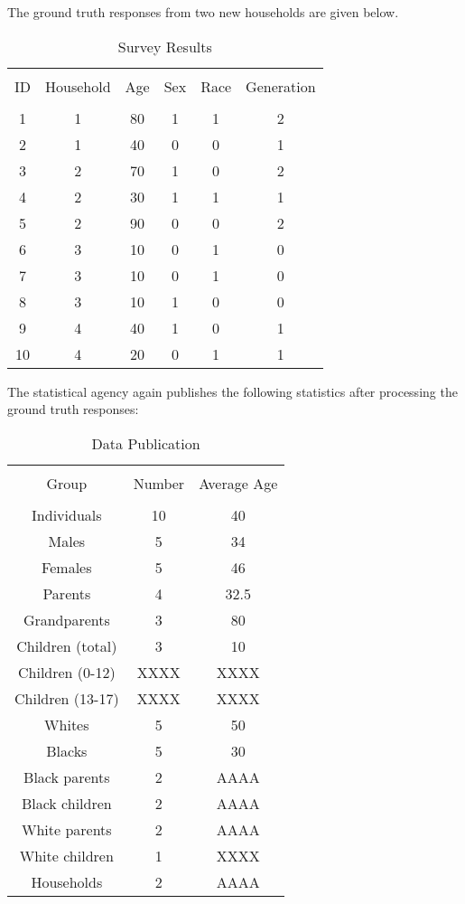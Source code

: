 \documentclass[jou,apacite]{apa6}
\begin{document}
The ground truth responses from two new households are given below.
\begin{table}[!htb]
\caption{Survey Results}\label{tab7}
\begin{tabular}{c|c|c|c|c|c}
\hline\\[-1.5ex]
ID & Household & Age & Sex & Race & Generation \\[0.5ex]
\hline\\[-1.5ex]
1 & 1 & 80 & 1 & 1 & 2  \\[0.5ex]
2 & 1 & 40 & 0 & 0 & 1  \\[0.5ex]
3 & 2 & 70 & 1 & 0 & 2  \\[0.5ex]
4 & 2 & 30 & 1 & 1 & 1  \\[0.5ex]
5 & 2 & 90 & 0 & 0 & 2  \\[0.5ex]
6 & 3 & 10 & 0 & 1 & 0  \\[0.5ex]
7 & 3 & 10 & 0 & 1 & 0  \\[0.5ex]
8 & 3 & 10 & 1 & 0 & 0  \\[0.5ex]
9 & 4 & 40 & 1 & 0 & 1 \\[0.5ex]
10 & 4 & 20 & 0 & 1 & 1 \\[0.5ex]
\hline
\end{tabular}
\end{table}

The statistical agency again publishes the following statistics after processing the ground truth responses:

\begin{table}[!htb]
\caption{Data Publication}\label{tab8}
\begin{tabular}{ccc}
\hline\\[-1.5ex]
Group & Number & Average Age \\[0.5ex]
\hline\\[-1.5ex]
Individuals & 10 & 40 \\[0.5ex]
Males & 5 & 34 \\[0.5ex]
Females & 5 & 46 \\[0.5ex]
Parents & 4 & 32.5 \\[0.5ex]
Grandparents & 3 & 80 \\[0.5ex]
Children (total) & 3 & 10 \\[0.5ex]
Children (0-12) & XXXX & XXXX \\[0.5ex]
Children (13-17) & XXXX & XXXX \\[0.5ex]
Whites & 5 & 50 \\[0.5ex]
Blacks & 5 & 30 \\[0.5ex]
Black parents & 2 & AAAA \\[0.5ex]
Black children & 2 & AAAA\\[0.5ex]
White parents & 2 & AAAA \\[0.5ex]
White children & 1 & XXXX \\[0.5ex]
Households & 2 & AAAA \\[0.5ex]
\hline
\end{tabular}
\end{table}
\end{document}
